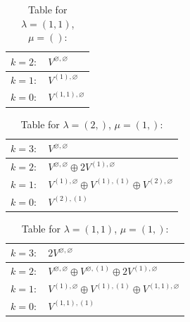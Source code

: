 \renewcommand{\arraystretch}{1.6} 
\begin{table}[H]
\centering
\caption{Table for $\lambda = (1, 1)$, $\mu = ()$:}
\begin{tabular}{|>{\centering\arraybackslash}p{15cm}|}
\hline
 $k = 2: \quad V^{\varnothing, \varnothing} $ \\ \hline
 $k = 1: \quad V^{(1), \varnothing} $ \\ \hline
 $k = 0: \quad V^{(1, 1), \varnothing} $ \\ \hline
\end{tabular}
\end{table}

\renewcommand{\arraystretch}{1.6} 
\begin{table}[H]
\centering
\caption{Table for $\lambda = (2,)$, $\mu = (1,)$:}
\begin{tabular}{|>{\centering\arraybackslash}p{15cm}|}
\hline
 $k = 3: \quad V^{\varnothing, \varnothing} $ \\ \hline
 $k = 2: \quad V^{\varnothing, \varnothing} \oplus 2 V^{(1), \varnothing} $ \\ \hline
 $k = 1: \quad V^{(1), \varnothing} \oplus V^{(1), (1)} \oplus V^{(2), \varnothing} $ \\ \hline
 $k = 0: \quad V^{(2), (1)} $ \\ \hline
\end{tabular}
\end{table}

\renewcommand{\arraystretch}{1.6} 
\begin{table}[H]
\centering
\caption{Table for $\lambda = (1, 1)$, $\mu = (1,)$:}
\begin{tabular}{|>{\centering\arraybackslash}p{15cm}|}
\hline
 $k = 3: \quad 2 V^{\varnothing, \varnothing} $ \\ \hline
 $k = 2: \quad V^{\varnothing, \varnothing} \oplus V^{\varnothing, (1)} \oplus 2 V^{(1), \varnothing} $ \\ \hline
 $k = 1: \quad V^{(1), \varnothing} \oplus V^{(1), (1)} \oplus V^{(1, 1), \varnothing} $ \\ \hline
 $k = 0: \quad V^{(1, 1), (1)} $ \\ \hline
\end{tabular}
\end{table}

